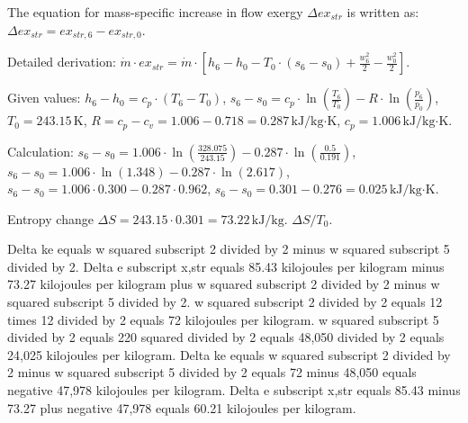 The equation for mass-specific increase in flow exergy \( \Delta ex_{str} \) is written as:  
\( \Delta ex_{str} = ex_{str,6} - ex_{str,0} \).  

Detailed derivation:  
\( \dot{m} \cdot ex_{str} = \dot{m} \cdot \left[ h_6 - h_0 - T_0 \cdot (s_6 - s_0) + \frac{w_6^2}{2} - \frac{w_0^2}{2} \right] \).  

Given values:  
\( h_6 - h_0 = c_{p} \cdot (T_6 - T_0) \),  
\( s_6 - s_0 = c_{p} \cdot \ln \left( \frac{T_6}{T_0} \right) - R \cdot \ln \left( \frac{p_6}{p_0} \right) \),  
\( T_0 = 243.15 \, \text{K} \), \( R = c_{p} - c_{v} = 1.006 - 0.718 = 0.287 \, \text{kJ/kg·K} \),  
\( c_{p} = 1.006 \, \text{kJ/kg·K} \).  

Calculation:  
\( s_6 - s_0 = 1.006 \cdot \ln \left( \frac{328.075}{243.15} \right) - 0.287 \cdot \ln \left( \frac{0.5}{0.191} \right) \),  
\( s_6 - s_0 = 1.006 \cdot \ln \left( 1.348 \right) - 0.287 \cdot \ln \left( 2.617 \right) \),  
\( s_6 - s_0 = 1.006 \cdot 0.300 - 0.287 \cdot 0.962 \),  
\( s_6 - s_0 = 0.301 - 0.276 = 0.025 \, \text{kJ/kg·K} \).  

Entropy change \( \Delta S = 243.15 \cdot 0.301 = 73.22 \, \text{kJ/kg} \).  
\( \Delta S / T_0 \).

Delta ke equals w squared subscript 2 divided by 2 minus w squared subscript 5 divided by 2.  
Delta e subscript x,str equals 85.43 kilojoules per kilogram minus 73.27 kilojoules per kilogram plus w squared subscript 2 divided by 2 minus w squared subscript 5 divided by 2.  
w squared subscript 2 divided by 2 equals 12 times 12 divided by 2 equals 72 kilojoules per kilogram.  
w squared subscript 5 divided by 2 equals 220 squared divided by 2 equals 48,050 divided by 2 equals 24,025 kilojoules per kilogram.  
Delta ke equals w squared subscript 2 divided by 2 minus w squared subscript 5 divided by 2 equals 72 minus 48,050 equals negative 47,978 kilojoules per kilogram.  
Delta e subscript x,str equals 85.43 minus 73.27 plus negative 47,978 equals 60.21 kilojoules per kilogram.